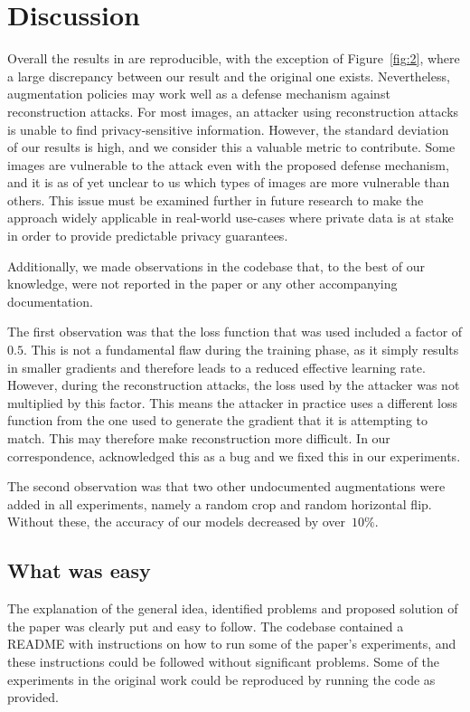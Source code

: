 \section{Discussion}
\label{sec:discussion}

Overall the results in \cite{gao2021privacy} are reproducible, with the exception of Figure~\ref{fig:2}, where a large discrepancy between our result and the original one exists. Nevertheless, augmentation policies may work well as a defense mechanism against reconstruction attacks. For most images, an attacker using reconstruction attacks is unable to find privacy-sensitive information. However, the standard deviation of our results is high, and we consider this a valuable metric to contribute. Some images are vulnerable to the attack even with the proposed defense mechanism, and it is as of yet unclear to us which types of images are more vulnerable than others. This issue must be examined further in future research to make the approach widely applicable in real-world use-cases where private data is at stake in order to provide predictable privacy guarantees.

Additionally, we made observations in the codebase that, to the best of our knowledge, were not reported in the paper or any other accompanying documentation.

The first observation was that the loss function that was used included a factor of $0.5$. This is not a fundamental flaw during the training phase, as it simply results in smaller gradients and therefore leads to a reduced effective learning rate. However, during the reconstruction attacks, the loss used by the attacker was not multiplied by this factor. This means the attacker in practice uses a different loss function from the one used to generate the gradient that it is attempting to match. This may therefore make reconstruction more difficult. In our correspondence, \citet{gao2021privacy} acknowledged this as a bug and we fixed this in our experiments.

The second observation was that two other undocumented augmentations were added in all experiments, namely a random crop and random horizontal flip. Without these, the accuracy of our models decreased by over~$10\%$.

\subsection{What was easy}

The explanation of the general idea, identified problems and proposed solution of the paper was clearly put and easy to follow. The codebase contained a README with instructions on how to run some of the paper's experiments, and these instructions could be followed without significant problems. Some of the experiments in the original work could be reproduced by running the code as provided.

